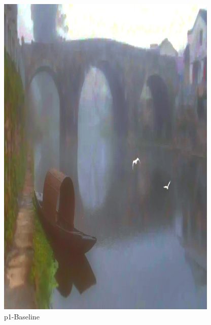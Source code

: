 \documentclass[12pt]{article}
\begin{document}
\begin{figure}[!h]
\begin{minipage}[t]{0.24\linewidth}
        \includegraphics[width=0.9\linewidth]{sample_pictures/after_p1_Baseline.jpg}
        \caption*{p1-Baseline}
    \end{minipage}
    \begin{minipage}[t]{0.24\linewidth}
        \centering

\end{minipage}
\end{figure}
\end{document}
